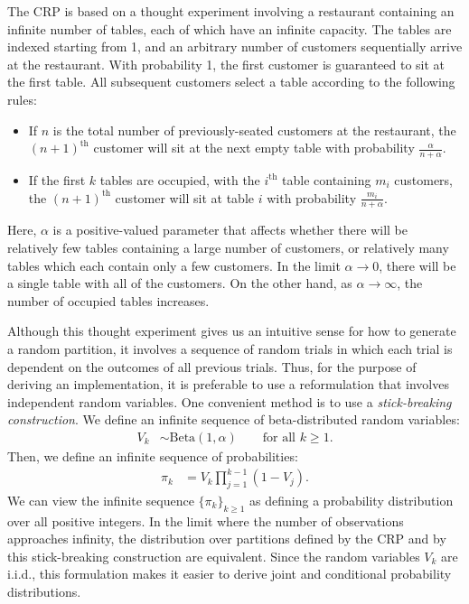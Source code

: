 \documentclass{article}
\newcommand{\nth}{^{\text{th}}}
\begin{document}
The CRP is based on a thought experiment involving a restaurant containing an infinite number of tables, each of which have an infinite capacity.
The tables are indexed starting from 1, and an arbitrary number of customers sequentially arrive at the restaurant.
With probability 1, the first customer is guaranteed to sit at the first table.
All subsequent customers select a table according to the following rules:
\begin{itemize}
\item If $n$ is the total number of previously-seated customers at the restaurant, the $(n+1)\nth$ customer will sit at the next empty table with probability $\frac{\alpha}{n + \alpha}$.
\item If the first $k$ tables are occupied, with the $i\nth$ table containing $m_i$ customers, the $(n+1)\nth$ customer will sit at table $i$ with probability $\frac{m_i}{n+\alpha}$.
\end{itemize}
Here, $\alpha$ is a positive-valued parameter that affects whether there will be relatively few tables containing a large number of customers, or relatively many tables which each contain only a few customers.
In the limit $\alpha \to 0$, there will be a single table with all of the customers.
On the other hand, as $\alpha \to \infty$, the number of occupied tables increases.

Although this thought experiment gives us an intuitive sense for how to generate a random partition, it involves a sequence of random trials in which each trial is dependent on the outcomes of all previous trials.
Thus, for the purpose of deriving an implementation, it is preferable to use a reformulation that involves independent random variables.
One convenient method is to use a \emph{stick-breaking construction}.
We define an infinite sequence of beta-distributed random variables:
\begin{align}
V_k &\sim \text{Beta}(1, \alpha) \qquad \text{for all $k \geq 1$}.
\end{align}
Then, we define an infinite sequence of probabilities:
\begin{align}
\pi_k &= V_k \prod_{j=1}^{k-1} (1-V_j).
\label{eq:pi_crp}
\end{align}
We can view the infinite sequence $\{\pi_k\}_{k \geq 1}$ as defining a probability distribution over all positive integers.
In the limit where the number of observations approaches infinity, the distribution over partitions defined by the CRP and by this stick-breaking construction are equivalent.
Since the random variables $V_k$ are i.i.d., this formulation makes it easier to derive joint and conditional probability distributions.
\end{document}
